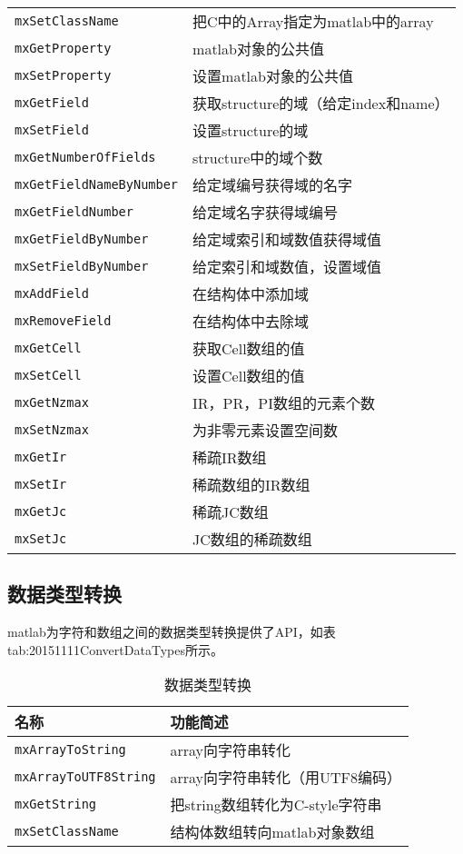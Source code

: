 \documentclass[10pt,a4paper,UTF8]{article}
\begin{document}
\begin{table}[htb]
\begin{tabular}{ll}
\texttt{mxSetClassName} & 把C中的Array指定为matlab中的array\\
\texttt{mxGetProperty} & matlab对象的公共值\\
\texttt{mxSetProperty} & 设置matlab对象的公共值\\
\texttt{mxGetField} & 获取structure的域（给定index和name）\\
\texttt{mxSetField} & 设置structure的域\\
\texttt{mxGetNumberOfFields} & structure中的域个数\\
\texttt{mxGetFieldNameByNumber} & 给定域编号获得域的名字\\
\texttt{mxGetFieldNumber} & 给定域名字获得域编号\\
\texttt{mxGetFieldByNumber} & 给定域索引和域数值获得域值\\
\texttt{mxSetFieldByNumber} & 给定索引和域数值，设置域值\\
\texttt{mxAddField} & 在结构体中添加域\\
\texttt{mxRemoveField} & 在结构体中去除域\\
\texttt{mxGetCell} & 获取Cell数组的值\\
\texttt{mxSetCell} & 设置Cell数组的值\\
\texttt{mxGetNzmax} & IR，PR，PI数组的元素个数\\
\texttt{mxSetNzmax} & 为非零元素设置空间数\\
\texttt{mxGetIr} & 稀疏IR数组\\
\texttt{mxSetIr} & 稀疏数组的IR数组\\
\texttt{mxGetJc} & 稀疏JC数组\\
\texttt{mxSetJc} & JC数组的稀疏数组\\
\hline
\end{tabular}
\end{table}

\subsection{数据类型转换}
\label{sec:orgheadline6}


matlab为字符和数组之间的数据类型转换提供了API，如表tab:20151111ConvertDataTypes所示。
\begin{table}[htb]
\caption{\label{tab:orgtable5}
数据类型转换}
\centering
\begin{tabular}{ll}
\hline
名称 & 功能简述\\
\hline
\texttt{mxArrayToString} & array向字符串转化\\
\texttt{mxArrayToUTF8String} & array向字符串转化（用UTF8编码）\\
\texttt{mxGetString} & 把string数组转化为C-style字符串\\
\texttt{mxSetClassName} & 结构体数组转向matlab对象数组\\
\hline
\end{tabular}
\end{table}
\end{document}
